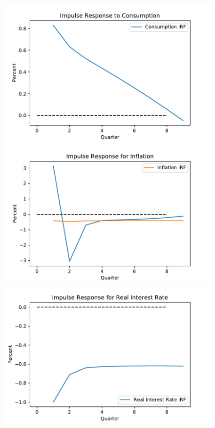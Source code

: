 \documentclass[titlepage]{\econtex}\newcommand{\texname}{ConsumptionHeterogeneity}
\begin{document}
\begin{figure} 
	\begin{centering}
		\includegraphics[scale=0.45]{../Python/Figures/IRF_C.pdf} \includegraphics[scale=0.45]{../Python/Figures/IRF_PI.pdf} \\
		\includegraphics[scale=0.45]{../Python/Figures/IRF_RB.pdf}

\end{centering}
\end{figure}
\end{document}
